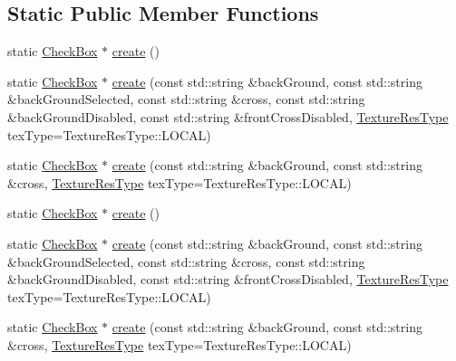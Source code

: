 \subsection*{Static Public Member Functions}
\begin{DoxyCompactItemize}
\item 
static \hyperlink{classui_1_1CheckBox}{Check\+Box} $\ast$ \hyperlink{classui_1_1CheckBox_a51ac8199ab6468a0dbff60454193fe95}{create} ()
\item 
static \hyperlink{classui_1_1CheckBox}{Check\+Box} $\ast$ \hyperlink{classui_1_1CheckBox_afa2664bd59e2dc90b39ef4085bdaeade}{create} (const std\+::string \&back\+Ground, const std\+::string \&back\+Ground\+Selected, const std\+::string \&cross, const std\+::string \&back\+Ground\+Disabled, const std\+::string \&front\+Cross\+Disabled, \hyperlink{classui_1_1Widget_a040a65ec5ad3b11119b7e16b98bd9af0}{Texture\+Res\+Type} tex\+Type=Texture\+Res\+Type\+::\+L\+O\+C\+AL)
\item 
static \hyperlink{classui_1_1CheckBox}{Check\+Box} $\ast$ \hyperlink{classui_1_1CheckBox_a6e695a5cd51c4e39690dda8909ea67b3}{create} (const std\+::string \&back\+Ground, const std\+::string \&cross, \hyperlink{classui_1_1Widget_a040a65ec5ad3b11119b7e16b98bd9af0}{Texture\+Res\+Type} tex\+Type=Texture\+Res\+Type\+::\+L\+O\+C\+AL)
\item 
static \hyperlink{classui_1_1CheckBox}{Check\+Box} $\ast$ \hyperlink{classui_1_1CheckBox_aab5aa345790ab101bdba6c6cdc716f0d}{create} ()
\item 
static \hyperlink{classui_1_1CheckBox}{Check\+Box} $\ast$ \hyperlink{classui_1_1CheckBox_a32455cdb64dd9778b3b8347993717552}{create} (const std\+::string \&back\+Ground, const std\+::string \&back\+Ground\+Selected, const std\+::string \&cross, const std\+::string \&back\+Ground\+Disabled, const std\+::string \&front\+Cross\+Disabled, \hyperlink{classui_1_1Widget_a040a65ec5ad3b11119b7e16b98bd9af0}{Texture\+Res\+Type} tex\+Type=Texture\+Res\+Type\+::\+L\+O\+C\+AL)
\item 
static \hyperlink{classui_1_1CheckBox}{Check\+Box} $\ast$ \hyperlink{classui_1_1CheckBox_ac71b0234eda95397a38db290951fe7ff}{create} (const std\+::string \&back\+Ground, const std\+::string \&cross, \hyperlink{classui_1_1Widget_a040a65ec5ad3b11119b7e16b98bd9af0}{Texture\+Res\+Type} tex\+Type=Texture\+Res\+Type\+::\+L\+O\+C\+AL)
\end{DoxyCompactItemize}
